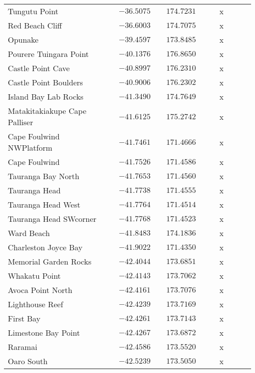\begin{table}[!htbp]
\begin{center}
\begin{tabular}{lcrcrcllcll}
Tungutu Point&&$-36.5075$&&$174.7231$&&&x&&&\tabularnewline
Red Beach Cliff&&$-36.6003$&&$174.7075$&&&x&&&\tabularnewline
Opunake&&$-39.4597$&&$173.8485$&&&x&&&\tabularnewline
Pourere Tuingara Point&&$-40.1376$&&$176.8650$&&&x&&&\tabularnewline
Castle Point Cave&&$-40.8997$&&$176.2310$&&&x&&&\tabularnewline
Castle Point Boulders&&$-40.9006$&&$176.2302$&&&x&&&\tabularnewline
Island Bay Lab Rocks&&$-41.3490$&&$174.7649$&&&x&&&\tabularnewline
Matakitakiakupe Cape Palliser&&$-41.6125$&&$175.2742$&&&x&&&\tabularnewline
Cape Foulwind NWPlatform&&$-41.7461$&&$171.4666$&&&x&&&\tabularnewline
Cape Foulwind&&$-41.7526$&&$171.4586$&&&x&&&\tabularnewline
Tauranga Bay North&&$-41.7653$&&$171.4560$&&&x&&&\tabularnewline
Tauranga Head&&$-41.7738$&&$171.4555$&&&x&&&\tabularnewline
Tauranga Head West&&$-41.7764$&&$171.4514$&&&x&&&\tabularnewline
Tauranga Head SWcorner&&$-41.7768$&&$171.4523$&&&x&&&\tabularnewline
Ward Beach&&$-41.8483$&&$174.1836$&&&x&&&\tabularnewline
Charleston Joyce Bay&&$-41.9022$&&$171.4350$&&&x&&&\tabularnewline
Memorial Garden Rocks&&$-42.4044$&&$173.6851$&&&x&&&\tabularnewline
Whakatu Point&&$-42.4143$&&$173.7062$&&&x&&&\tabularnewline
Avoca Point North&&$-42.4161$&&$173.7076$&&&x&&&\tabularnewline
Lighthouse Reef&&$-42.4239$&&$173.7169$&&&x&&&\tabularnewline
First Bay&&$-42.4261$&&$173.7143$&&&x&&&\tabularnewline
Limestone Bay Point&&$-42.4267$&&$173.6872$&&&x&&&\tabularnewline
Raramai&&$-42.4586$&&$173.5520$&&&x&&&\tabularnewline
Oaro South&&$-42.5239$&&$173.5050$&&&x&&&\tabularnewline
\hline
\end{tabular}\end{center}
\end{table}
